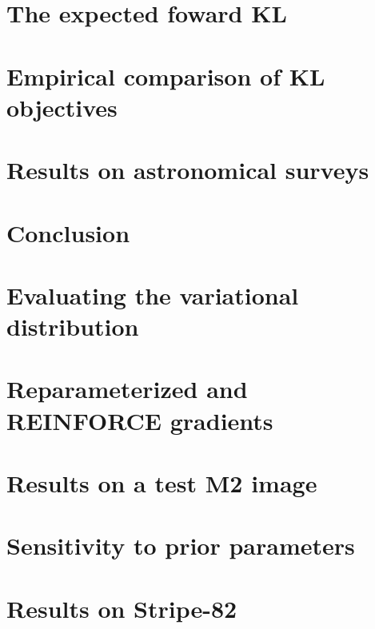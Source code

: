 \documentclass[twoside,11pt]{article}
\begin{document}
\section{The expected foward KL}
\label{sec:wake_sleep}




\section{Empirical comparison of KL objectives}


\section{Results on astronomical surveys}


\section{Conclusion}
\label{sec:discussion}




\acks{}


\newpage

\appendix
\renewcommand\thefigure{A.\arabic{figure}}
\renewcommand\thetable{A.\arabic{table}}
\setcounter{figure}{0}
\setcounter{table}{0}


\section{Evaluating the variational distribution}
\label{sec:eval_var_distr}


\section{Reparameterized and REINFORCE gradients}
\label{sec:reparam_details}


\section{Results on a test M2 image}
\label{sec:test_m2}



\section{Sensitivity to prior parameters}
\label{sec:prior_sensitivity}



\section{Results on Stripe-82}
\label{sec:results_sparse_field}


\clearpage

\vskip 0.2in

\end{document}
